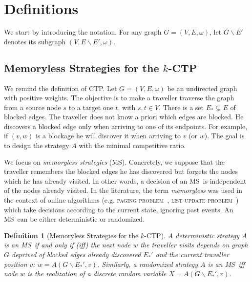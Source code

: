 \documentclass[preprint]{elsarticle}
\newtheorem{definition}{Definition}
\newcommand{\kctp}{$k$-CTP}
\newcommand{\stpath}{$(s,t)$-path}
\newcommand{\mts}{MS}
\begin{document}
\section{Definitions} \label{sec:def}

We start by introducing the notation. For any graph $G=\left(V,E,\omega\right)$, let $G\backslash E'$ denotes its subgraph $\left(V,E\backslash E',\omega\right)$. 

\subsection{Memoryless Strategies for the \kctp} \label{subsec:msintro}

We remind the definition of CTP. Let $G=\left(V,E,\omega\right)$ be an undirected graph with positive weights. The objective is to make a traveller traverse the graph from a source node $s$ to a target one $t$, with $s,t \in V$. There is a set $E_* \subsetneq E$ of blocked edges. %
The traveller does not know a priori which edges are blocked. He discovers a blocked edge only when arriving to one of its endpoints. For example, if $\left(v,w\right)$ is a blockage he will discover it when arriving to $v$ (or $w$). The goal is to design the strategy $A$ with the minimal competitive ratio.

We focus on \textit{memoryless strategies} (\mts). Concretely, we suppose that the traveller remembers the blocked edges he has discovered but forgets the nodes which he has already visited. In other words, a decision of an \mts ~is independent of the nodes already visited. In the literature, the term \textit{memoryless} was used in the context of online algorithms (e.g. \textsc{paging problem}~\cite{BoEl98}, \textsc{list update problem}~\cite{Al03}) which take decisions according to the current state, ignoring past events. An \mts ~can be either deterministic or randomized.



\begin{definition}[Memoryless Strategies for the \kctp]
A deterministic strategy $A$ is an \mts ~if and only if (iff) the next node $w$ the traveller visits depends on graph $G$ deprived of blocked edges already discovered $E_*'$ and the current traveller position $v$: $w = A\left(G\backslash E_*',v\right)$. Similarly, a randomized strategy $A$ is an \mts ~iff node $w$ is the realization of a discrete random variable $X = A\left(G\backslash E_*',v\right)$.
\end{definition}
\end{document}
